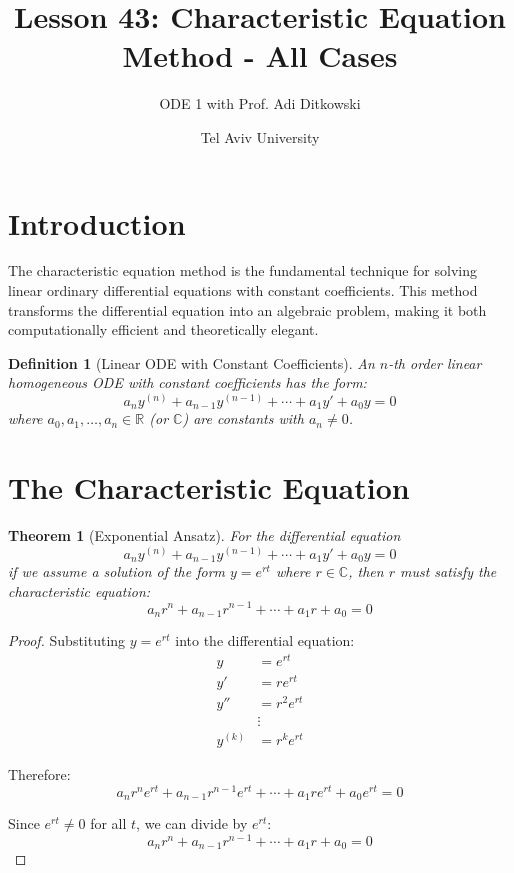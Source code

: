 \documentclass[12pt]{article}
\title{Lesson 43: Characteristic Equation Method - All Cases}
\author{ODE 1 with Prof. Adi Ditkowski}
\date{Tel Aviv University}
\newtheorem{definition}{Definition}
\newtheorem{theorem}{Theorem}
\begin{document}
\maketitle

\section{Introduction}

The characteristic equation method is the fundamental technique for solving linear ordinary differential equations with constant coefficients. This method transforms the differential equation into an algebraic problem, making it both computationally efficient and theoretically elegant.

\begin{definition}[Linear ODE with Constant Coefficients]
An $n$-th order linear homogeneous ODE with constant coefficients has the form:
$$a_n y^{(n)} + a_{n-1} y^{(n-1)} + \cdots + a_1 y' + a_0 y = 0$$
where $a_0, a_1, \ldots, a_n \in \mathbb{R}$ (or $\mathbb{C}$) are constants with $a_n \neq 0$.
\end{definition}

\section{The Characteristic Equation}

\begin{theorem}[Exponential Ansatz]
For the differential equation
$$a_n y^{(n)} + a_{n-1} y^{(n-1)} + \cdots + a_1 y' + a_0 y = 0$$
if we assume a solution of the form $y = e^{rt}$ where $r \in \mathbb{C}$, then $r$ must satisfy the characteristic equation:
$$a_n r^n + a_{n-1} r^{n-1} + \cdots + a_1 r + a_0 = 0$$
\end{theorem}

\begin{proof}
Substituting $y = e^{rt}$ into the differential equation:
\begin{align}
y &= e^{rt} \\
y' &= re^{rt} \\
y'' &= r^2e^{rt} \\
&\vdots \\
y^{(k)} &= r^k e^{rt}
\end{align}

Therefore:
$$a_n r^n e^{rt} + a_{n-1} r^{n-1} e^{rt} + \cdots + a_1 r e^{rt} + a_0 e^{rt} = 0$$

Since $e^{rt} \neq 0$ for all $t$, we can divide by $e^{rt}$:
$$a_n r^n + a_{n-1} r^{n-1} + \cdots + a_1 r + a_0 = 0$$
\end{proof}
\end{document}
